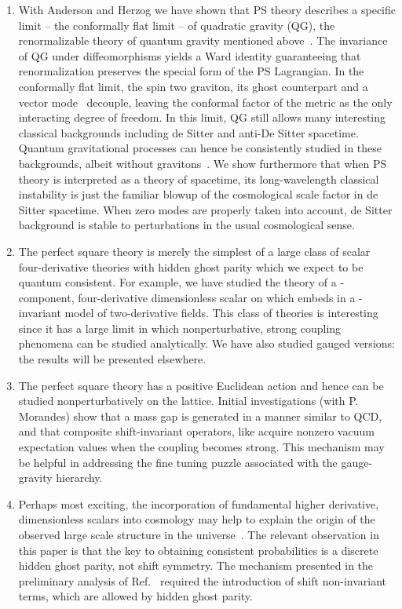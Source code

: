 \documentclass[pra,aps,amsmath,amssymb,notitlepage, twocolumn,superscriptaddress,longbibliography,nofootinbib,floatfix,10pt]{revtex4-2}
\makeatletter
\newcounter{mathrecordid}
\newcommand{\mathboxbegin}[1]{%
  \stepcounter{mathrecordid}%
  \immediate\write\mathrecords{\themathrecordid,#1}%
  \special{pdf:bann << /Type /Annot /Subtype /Link /Border [0 0 0]
    /MathBoxID \themathrecordid /F 2
    /A << /S /URI /URI (urn:mathbox:\themathrecordid) >> >>}}
\newcommand{\mathboxinlineplain}[1]{$#1$}
\newcommand{\mathboxinline}[1]{%
  $\mathboxbegin{inline}%
  \special{pdf:literal direct /MathBoxBegin\themathrecordid\space MP}%
  #1\special{pdf:literal direct /MathBoxEnd\themathrecordid\space MP}%
  \special{pdf:eann}$}
\newcommand{\recordmath}{%
  \ifmeasuring@\expandafter\mathboxinlineplain
  \else\expandafter\mathboxinline\fi}
\makeatother
\begin{document}
\begin{enumerate}
\item With Anderson and Herzog we have shown that PS theory describes a specific limit -- the conformally flat limit -- of quadratic gravity (QG), the renormalizable theory of quantum gravity mentioned above~\cite{ABHTshort}. The invariance of QG under diffeomorphisms yields a Ward identity guaranteeing that renormalization preserves the special form of the PS Lagrangian. 
In the conformally flat limit, the spin two graviton, its ghost counterpart and a vector mode~\cite{Riegert:1984zz} decouple, leaving the conformal factor of the metric as the only interacting degree of freedom. In this limit, QG still allows many interesting classical backgrounds including de Sitter and anti-De Sitter spacetime. Quantum gravitational processes can hence be consistently studied in these backgrounds, albeit without gravitons~\cite{ABHTshort}. We show furthermore that when PS theory is interpreted as a theory of spacetime, its long-wavelength classical instability is just the familiar blowup of the cosmological scale factor in de Sitter spacetime. When zero modes are properly taken into account, de Sitter background is stable to perturbations in the usual cosmological sense. %


\item The perfect square theory is merely the simplest of a large class of scalar four-derivative theories with hidden ghost parity which we expect to be quantum consistent. For example, we have studied the theory of a \recordmath{N}-component, four-derivative dimensionless scalar on \recordmath{\mathbb{R}\times S^{N-1}} which embeds in a \recordmath{O(N,N)}-invariant model of two-derivative fields. This class of theories is interesting since it has a large \recordmath{N} limit in which nonperturbative, strong coupling phenomena can be studied analytically. We have also studied gauged versions: the results will be presented elsewhere. 
\item The perfect square theory has a positive Euclidean action and hence can be studied nonperturbatively on the lattice. Initial investigations (with P. Morandes)  show that a mass gap is generated in a manner similar to QCD, and that composite shift-invariant operators, like \recordmath{(\partial \phi)^2} acquire nonzero vacuum expectation values when the coupling \recordmath{\lambda} becomes strong.
This mechanism may be helpful in addressing the fine tuning puzzle associated with the gauge-gravity hierarchy. 
\item Perhaps most exciting, the incorporation of fundamental higher derivative, dimensionless scalars into cosmology may help to explain the origin of the observed large scale structure in the universe~\cite{Turok:2023amx}. The relevant observation in this paper is that the key to obtaining consistent probabilities is a discrete hidden ghost parity, not shift symmetry. The mechanism  presented in the preliminary analysis of Ref.~\cite{Turok:2023amx} required the introduction of shift non-invariant terms, which are allowed by hidden ghost parity.  

\end{enumerate}
\end{document}
